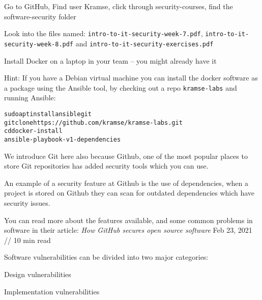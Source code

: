 \documentclass[Screen16to9,17pt]{foils}
\begin{document}

\begin{list2}
\item Go to GitHub, Find user Kramse, click through security-courses, find the software-security folder\\
\item Look into the files named: \verb+intro-to-it-security-week-7.pdf+, \verb+intro-to-it-security-week-8.pdf+ and \verb+intro-to-it-security-exercises.pdf+
\item Install Docker on a laptop in your team -- you might already have it
\end{list2}

Hint: If you have a Debian virtual machine you can install the docker software as a package using the Ansible tool, by checking out a repo \verb+kramse-labs+ and running Ansible:
\begin{alltt}
sudo apt install ansible git
git clone https://github.com/kramse/kramse-labs.git
cd docker-install
ansible-playbook -v 1-dependencies
\end{alltt}


We introduce Git here also because Github, one of the most popular places to store Git repositories has added security tools which you can use.

An example of a security feature at Github is the use of dependencies, when a project is stored on Github they can scan for outdated dependencies which have security issues.

You can read more about the features available, and some common problems in software in their article:
\emph{How GitHub secures open source software}
Feb 23, 2021 // 10 min read\\






Software vulnerabilities can be divided into two major categories:
\begin{list2}
\item Design vulnerabilities
\item Implementation vulnerabilities
\end{list2}
\end{document}
